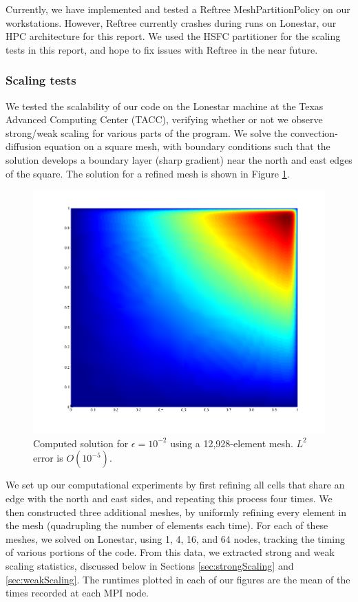 Currently, we have implemented and tested a Reftree MeshPartitionPolicy on our workstations. However, Reftree currently crashes during runs on Lonestar, our HPC architecture for this report. We used the HSFC partitioner for the scaling tests in this report, and hope to fix issues with Reftree in the near future. 

\subsubsection{Scaling tests}\label{sec:ScalingExperiments}

We tested the scalability of our code on the Lonestar machine at the Texas Advanced Computing Center (TACC), verifying whether or not we observe strong/weak scaling for various parts of the program.  We solve the convection-diffusion equation on a square mesh, with boundary conditions such that the solution develops a boundary layer (sharp gradient) near the north and east edges of the square.  The solution for a refined mesh is shown in Figure \ref{fig:solutionPlot}.

\begin{figure}[h!]
\centering
\includegraphics[scale=0.45]{figs/Solution12928nomesh.png}
\caption{Computed solution for $\epsilon=10^{-2}$ using a 12,928-element mesh.  $L^2$ error is $O(10^{-5})$.}
\label{fig:solutionPlot}
\end{figure}

We set up our computational experiments by first refining all cells that share an edge with the north and east sides, and repeating this process four times.   We then constructed three additional meshes, by uniformly refining every element in the mesh (quadrupling the number of elements each time).  For each of these meshes, we solved on Lonestar, using 1, 4, 16, and 64 nodes, tracking the timing of various portions of the code.  From this data, we extracted strong and weak scaling statistics, discussed below in Sections \ref{sec:strongScaling} and \ref{sec:weakScaling}.  The runtimes plotted in each of our figures are the mean of the times recorded at each MPI node.

